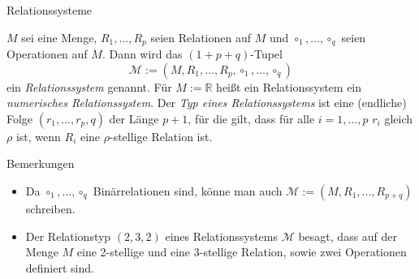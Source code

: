 \documentclass[
  8pt,
  ignorenonframetext,
]{beamer}
\providecommand{\tightlist}{%
  \setlength{\itemsep}{0pt}\setlength{\parskip}{0pt}}
\begin{document}
\begin{frame}{Relationssysteme}
\protect\hypertarget{relationssysteme}{}
\small
\begin{definition}[Relationssystem]
\justifying
$M$ sei eine Menge, $R_1,...,R_p$ seien Relationen auf $M$ und $\circ_1,...,\circ_q$
seien Operationen auf $M$. Dann wird das $(1 + p + q)$-Tupel
\begin{equation}
\mathcal{M} := (M,R_1,...,R_p, \circ_1,...,\circ_q)
\end{equation}
ein \textit{Relationssystem} genannt. Für $M := \mathbb{R}$ heißt ein Relationssystem
ein \textit{numerisches Relationssystem}. Der \textit{Typ eines Relationssystems}
ist eine (endliche) Folge $(r_1,...,r_p,q)$ der Länge $p+1$, für die gilt, dass für alle
$i = 1,...,p$ $r_i$ gleich $\rho$ ist, wenn $R_i$ eine $\rho$-stellige Relation ist.
\end{definition}
\footnotesize

Bemerkungen

\begin{itemize}
\tightlist
\item
  Da \(\circ_1,...,\circ_q\) Binärrelationen sind, könne man auch
  \(\mathcal{M} := (M,R_1,...,R_{p+q})\) schreiben.
\item
  Der Relationstyp \((2,3,2)\) eines Relationssystems \(\mathcal{M}\)
  besagt, dass auf der Menge \(M\) eine 2-stellige und eine 3-stellige
  Relation, sowie zwei Operationen definiert sind.
\end{itemize}
\end{frame}
\end{document}

